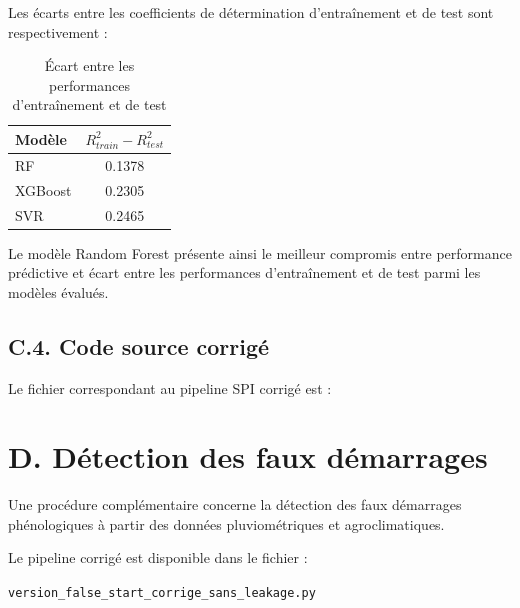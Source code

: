 Les écarts entre les coefficients de détermination d'entraînement et de test
sont respectivement :

\begin{table}[htbp]
\centering
\caption{Écart entre les performances d'entraînement et de test}
\begin{tabular}{lc}
\hline
Modèle & $R^2_{train}-R^2_{test}$ \\
\hline
RF & 0.1378 \\
XGBoost & 0.2305 \\
SVR & 0.2465 \\
\hline
\end{tabular}
\end{table}

Le modèle Random Forest présente ainsi le meilleur compromis entre
performance prédictive et écart entre les performances d'entraînement et de
test parmi les modèles évalués.

\subsection*{C.4. Code source corrigé}

Le fichier correspondant au pipeline SPI corrigé est :




\section*{D. Détection des faux démarrages}

Une procédure complémentaire concerne la détection des faux démarrages
phénologiques à partir des données pluviométriques et agroclimatiques.

Le pipeline corrigé est disponible dans le fichier :

\begin{center}
\texttt{version\_false\_start\_corrige\_sans\_leakage.py}
\end{center}




